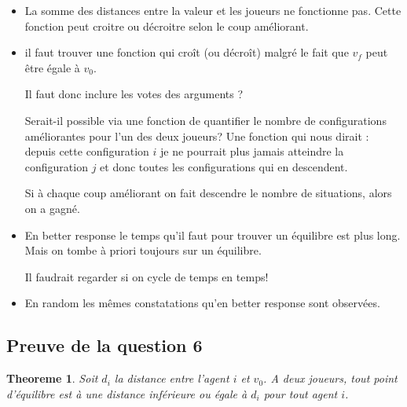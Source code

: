\documentclass[12pt]{article}
\newtheorem{theoreme}{Theoreme}[section]
\theoremstyle{defi}
\theoremstyle{not}
\theoremstyle{prob}
\begin{document}
        \begin{itemize}
          \item La somme des distances entre la valeur et les joueurs ne fonctionne pas.
            Cette fonction peut croitre ou décroitre selon le coup améliorant.

          \item il faut trouver une fonction qui croît (ou décroît) malgré le fait que $v_f$ peut être égale à $v_0$.

            Il faut donc inclure les votes des arguments ?

            Serait-il possible via une fonction de quantifier le nombre de configurations améliorantes pour l'un des deux joueurs? Une fonction qui nous dirait : depuis cette configuration $i$ je ne pourrait plus jamais atteindre la configuration $j$ et donc toutes les configurations qui en descendent.

            Si à chaque coup améliorant on fait descendre le nombre de situations, alors on a gagné.

          \item En better response le temps qu'il faut pour trouver un équilibre est plus long. Mais on tombe à priori toujours sur un équilibre.

          Il faudrait regarder si on cycle de temps en temps!

          \item En random les mêmes constatations qu'en better response sont observées.
        \end{itemize}
    \subsection{Preuve de la question 6}
    \begin{theoreme}
    \label{thm:question_6}
      Soit $d_i$ la distance entre l'agent $i$ et $v_0$. A deux joueurs, tout point d'équilibre est à une distance inférieure ou égale à $d_i$ pour tout agent $i$.
    \end{theoreme}
\end{document}
